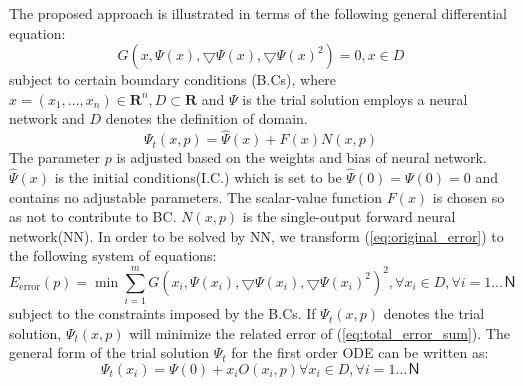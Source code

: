\documentclass{article}
\begin{document}
The proposed approach is illustrated in terms of the following general differential equation:
\begin{equation}\label{eq:original_error}
G(x,\Psi (x),\bigtriangledown \Psi (x), \bigtriangledown \Psi (x)^2) = 0, x \in D
\end{equation}
\medskip \noindent
subject to certain boundary conditions (B.Cs),  where $x=(x_1, \dots , x_n) \in \mathbf{R}^n, D \subset \mathbf{R}$ and $\Psi$ is the trial solution employs a neural network and $D$ denotes the definition of domain. 
\begin{equation}\label{eq:trial_solution}
\Psi_{t}(x,p) = \hat{\Psi}(x) + F(x)N(x,p)
\end{equation}
The parameter $p$ is adjusted based on the weights and bias of neural network. 
$\hat{\Psi}(x)$ is the initial conditions(I.C.) which is set to be $\hat{\Psi}(0) = \Psi (0) =0$ and contains no adjustable parameters.
The scalar-value function $F(x)$ is chosen so as not to contribute to BC. 
$N(x,p)$ is the single-output forward neural network(NN).  
In order to be solved by NN, we transform (\ref{eq:original_error}) to the  following system of equations:
\begin{equation}\label{eq:total_error_sum}
E_{\text{error}}(p) = \min \sum_{i=1}^{m} G(x_i,\Psi (x_i),\bigtriangledown \Psi (x_i), \bigtriangledown \Psi (x_i)^2) ^2, \forall x_i \in D, \forall i = 1 \dots Ｎ
\end{equation}
subject to the constraints imposed by the B.Cs.
If $\Psi_{t}(x,p)$ denotes the trial solution, $\Psi_{t}(x,p)$ will minimize the related error of (\ref{eq:total_error_sum}). The general form of the trial solution $\Psi _t$ for the first order ODE can be written as:
\begin{equation}\label{eq:trial_sol_ode1}
\Psi_{t} (x_i) = \Psi(0) + x_iO(x_i,p) \forall x_i \in D, \forall i = 1 \dots Ｎ
\end{equation} 

\end{document}

